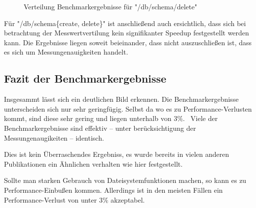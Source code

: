 \begin{figure}[H]
    \centering
    
    \caption{Verteilung Benchmarkergebnisse für "/db/schema/delete"}
    \label{fig:mdist_db_schema_delete}
\end{figure}

Für "/db/schema\{create, delete\}" ist anschließend auch ersichtlich, dass sich bei betrachtung der Messwertvertilung kein signifikanter Speedup festgestellt werden kann. Die Ergebnisse liegen soweit beieinander, dass nicht auszuschließen ist, dass es sich um Messungenauigkeiten handelt.

\FloatBarrier

\subsection{Fazit der Benchmarkergebnisse}

Insgesammt lässt sich ein deutlichen Bild erkennen. Die Benchmarkergebnisse unterscheiden sich nur sehr geringfügig. Selbst da wo es zu Performance-Verlusten kommt, sind diese sehr gering und liegen unterhalb von $3\%$. \
Viele der Benchmarkergebnisse sind effektiv – unter berücksichtigung der Messungenaugikeiten – identisch.

Dies ist kein Überraschendes Ergebniss, es wurde bereits in vielen anderen Publikationen ein Ähnlichen verhalten wie hier festgestellt.  

Sollte man starken Gebrauch von Dateisystemfunktionen machen, so kann es zu Performance-Einbußen kommen. Allerdings ist in den meisten Fällen ein Performance-Verlust von unter $3\%$ akzeptabel. 